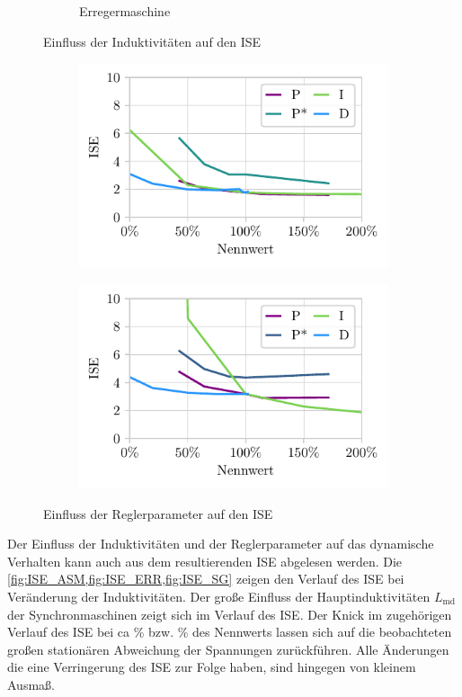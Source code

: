 \begin{figure}
\begin{subfigure}{\textwidth}
        \caption{Erregermaschine }
        \label{fig:ISE_ERR}    
    \end{subfigure}
    \caption{Einfluss der Induktivitäten auf den ISE}
\end{figure}
\begin{figure}
    \centering
    \begin{subfigure}{.49\linewidth}
        \centering
        \includegraphics{Bilder/regler_ISE_korr.pdf}    
    \end{subfigure}
    \begin{subfigure}{.49\linewidth}
        \centering
        \includegraphics{Bilder/simulation_reglerSweep_korr.pdf}
    \end{subfigure}
    \caption{Einfluss der Reglerparameter auf den ISE}
    \label{fig:ISE_ReglerSweep}
\end{figure}

Der Einfluss der Induktivitäten und der Reglerparameter auf das dynamische Verhalten kann auch aus dem resultierenden ISE abgelesen werden. Die \cref{fig:ISE_ASM,fig:ISE_ERR,fig:ISE_SG} zeigen den Verlauf des ISE bei Veränderung der Induktivitäten. Der große Einfluss der Hauptinduktivitäten $L_{\mathrm{md}}$ der Synchronmaschinen zeigt sich im Verlauf des ISE. Der Knick im zugehörigen Verlauf des ISE bei ca \unit[48]{\%} bzw. \unit[33]{\%} des Nennwerts lassen sich auf die beobachteten großen stationären Abweichung der Spannungen zurückführen. Alle Änderungen die eine Verringerung des ISE zur Folge haben, sind hingegen von kleinem Ausmaß.

